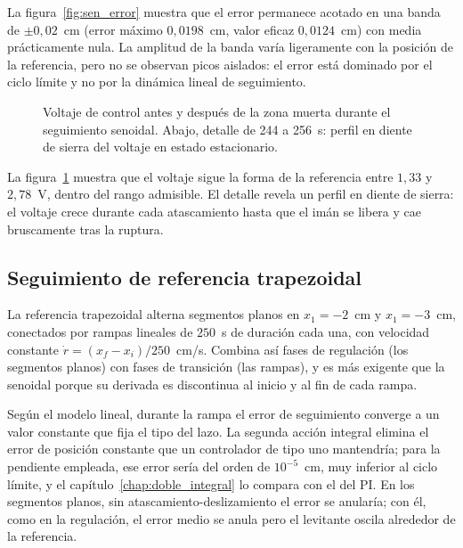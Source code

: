La figura~\ref{fig:sen_error} muestra que el error permanece acotado en una banda de $\pm 0{,}02$~cm (error máximo $0{,}0198$~cm, valor eficaz $0{,}0124$~cm) con media prácticamente nula. La amplitud de la banda varía ligeramente con la posición de la referencia, pero no se observan picos aislados: el error está dominado por el ciclo límite y no por la dinámica lineal de seguimiento.

\FloatBarrier

\begin{figure}[ht]
    \centering
    
    \caption[Seguimiento senoidal: señal de control]{Voltaje de control antes y después de la zona muerta durante el seguimiento senoidal. Abajo, detalle de 244 a 256~s: perfil en diente de sierra del voltaje en estado estacionario.}
    \label{fig:sen_ctrl}
\end{figure}

La figura~\ref{fig:sen_ctrl} muestra que el voltaje sigue la forma de la referencia entre $1{,}33$ y $2{,}78$~V, dentro del rango admisible. El detalle revela un perfil en diente de sierra: el voltaje crece durante cada atascamiento hasta que el imán se libera y cae bruscamente tras la ruptura.

\FloatBarrier

\subsection{Seguimiento de referencia trapezoidal}

La referencia trapezoidal alterna segmentos planos en $x_1 = -2$~cm y $x_1 = -3$~cm, conectados por rampas lineales de $250$~s de duración cada una, con velocidad constante $\dot{r} = (x_{f}-x_{i})/250$~cm/s. Combina así fases de regulación (los segmentos planos) con fases de transición (las rampas), y es más exigente que la senoidal porque su derivada es discontinua al inicio y al fin de cada rampa.

Según el modelo lineal, durante la rampa el error de seguimiento converge a un valor constante que fija el tipo del lazo. La segunda acción integral elimina el error de posición constante que un controlador de tipo uno mantendría; para la pendiente empleada, ese error sería del orden de $10^{-5}$~cm, muy inferior al ciclo límite, y el capítulo~\ref{chap:doble_integral} lo compara con el del PI. En los segmentos planos, sin atascamiento-deslizamiento el error se anularía; con él, como en la regulación, el error medio se anula pero el levitante oscila alrededor de la referencia.

